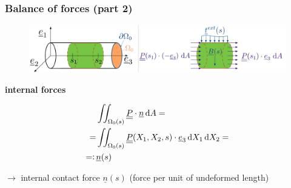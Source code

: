 \begin{frame}
  \frametitle{Balance of forces (part 2)}

  \begin{figure}
    \centering
    \includegraphics[width=22cm, keepaspectratio=true]{sections/cosserat_rods/images/Forces}
  \end{figure}


  \textbf{internal forces}
  
  \begin{displaymath}
    \begin{alignedat}{1}
      &\iint_{\Omega_0(s)} \doubleunderline{P} \cdot \underline{n} \dif A = \\
      = &\iint_{\Omega_0(s)} \doubleunderline{P}(X_1, X_2, s) \cdot \underline{e}_3 \dif X_1 \dif X_2 = \\
      =: \, &\underline{n}(s)
    \end{alignedat}
  \end{displaymath}
  
  \vspace{0.5em}
  $\rightarrow$ internal contact force $\underline{n}(s)$ (force per unit of undeformed length)
\end{frame}



